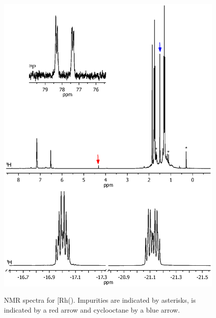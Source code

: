 \begin{figure}[htbp]
\begin{center}
\vspace{0.5cm}
\includegraphics[trim = 2.5cm 8.5cm 2.5cm 0cm, clip]{../NMR/7006E.eps}
\caption[NMR spectra for \ce{[Rh(\tButhixantphos)Cl(H)2]}]{NMR spectra for \texorpdfstring{[Rh(\tButhixantphos)\ce{Cl(H)2]}} R.  Impurities are indicated by asterisks,  is indicated by a red arrow and cyclooctane by a blue arrow.}
\vspace{0.2cm}
\label{rhodiumhydridenmr}
\end{center}
\end{figure}
\vspace{0.2cm}

